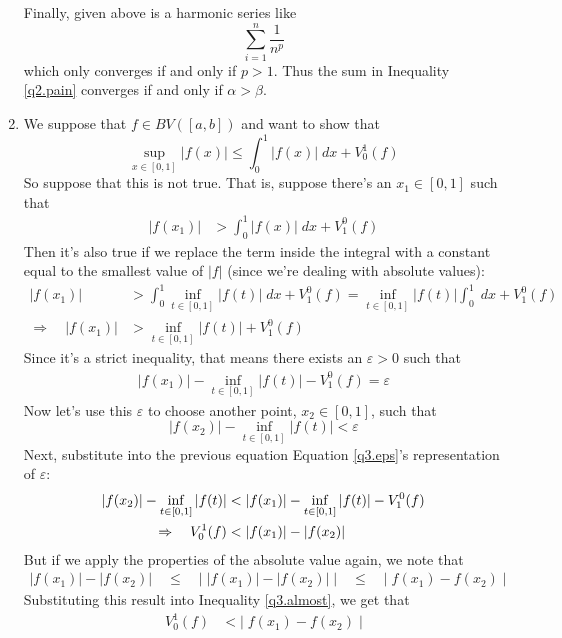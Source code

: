 \documentclass[12pt]{article}
\theoremstyle{plain}
\theoremstyle{definition}
\theoremstyle{remark}
\begin{document}
\begin{enumerate}
Finally, given above is a harmonic series like
\[
    \sum^n_{i=1} \frac{1}{n^p}
\]
which only converges if and only if $p>1$. Thus the sum in Inequality \ref{q2.pain} converges if and only if $\alpha>\beta$.

\newpage
\item We suppose that $f\in BV([a,b])$ and want to show that
    \[ \sup_{x\in[0,1]} |f(x)| \leq \int^1_0 |f(x)|\;dx
        + V^1_0(f) \]
    So suppose that this is not true.  That is, suppose there's an $x_1\in[0,1]$ such that
\begin{align*}
    |f(x_1)| &> \int^1_0 |f(x)|\;dx + V_1^0(f)  
\end{align*}
Then it's also true if we replace the term inside the integral with a constant equal to the smallest value of $|f|$ (since we're dealing with absolute values):
\begin{align*}
    |f(x_1)| &> \int^1_0 \inf_{t\in[0,1]} |f(t)|\;dx + V_1^0(f)  
        = \inf_{t\in[0,1]} |f(t)| \int^1_0 \;dx + V_1^0(f)  \\
    \Rightarrow \quad
        |f(x_1)| &> 
        \inf_{t\in[0,1]} |f(t)| + V_1^0(f) 
\end{align*}
Since it's a strict inequality, that means there exists an $\varepsilon>0$ such that
\begin{align}
    \label{q3.eps}
    |f(x_1)|  - \inf_{t\in[0,1]} |f(t)| - V_1^0(f) = \varepsilon  
\end{align}
Now let's use this $\varepsilon$ to choose another point, $x_2\in[0,1]$, such that
\[ 
    |f(x_2)| - \inf_{t\in[0,1]} |f(t)|  < \varepsilon
\]
Next, substitute into the previous equation Equation \ref{q3.eps}'s representation of $\varepsilon$: 
\begin{align}
    |f(x_2)| - \inf_{t\in[0,1]} |f(t)| &< 
        |f(x_1)|  - \inf_{t\in[0,1]} |f(t)| - V_1^0(f) \notag \\
    \Rightarrow \quad
        V_0^1(f) &< |f(x_1)| - |f(x_2)| 
        \label{q3.almost}
\end{align}
But if we apply the properties of the absolute value again, we note that
\begin{align*}
    |f(x_1)| - |f(x_2)| \quad \leq \quad
        \left\lvert\; |f(x_1)| - |f(x_2)|\; \right\rvert 
        \quad\leq\quad 
        \left\lvert\; f(x_1) - f(x_2)\; \right\rvert 
\end{align*}
Substituting this result into Inequality \ref{q3.almost}, we get that
\begin{align}
        V_0^1(f) &<
        \left\lvert\; f(x_1) - f(x_2)\; \right\rvert 

\end{align}
\end{enumerate}
\end{document}
